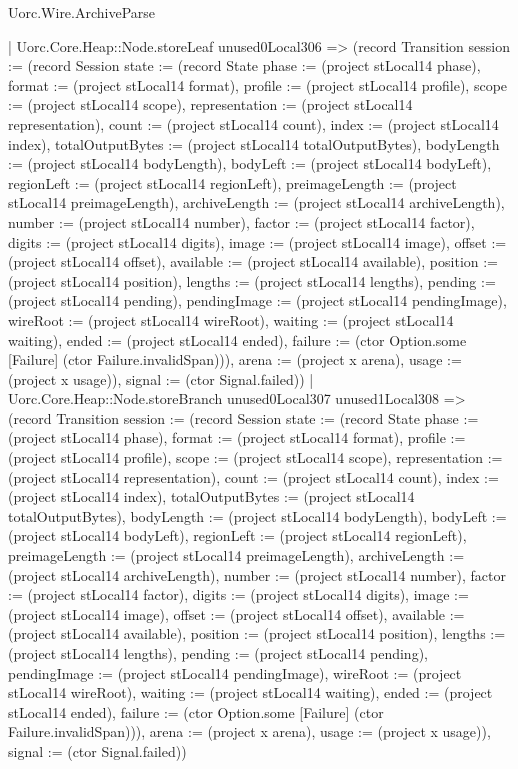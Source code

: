 \begin{lexlean}{Uorc.Wire.ArchiveParse}
\begin{semanticmodule}
{            | Uorc.Core.Heap::Node.storeLeaf unused0Local306 => (record Transition {session := (record Session {state := (record State {phase := (project stLocal14 phase), format := (project stLocal14 format), profile := (project stLocal14 profile), scope := (project stLocal14 scope), representation := (project stLocal14 representation), count := (project stLocal14 count), index := (project stLocal14 index), totalOutputBytes := (project stLocal14 totalOutputBytes), bodyLength := (project stLocal14 bodyLength), bodyLeft := (project stLocal14 bodyLeft), regionLeft := (project stLocal14 regionLeft), preimageLength := (project stLocal14 preimageLength), archiveLength := (project stLocal14 archiveLength), number := (project stLocal14 number), factor := (project stLocal14 factor), digits := (project stLocal14 digits), image := (project stLocal14 image), offset := (project stLocal14 offset), available := (project stLocal14 available), position := (project stLocal14 position), lengths := (project stLocal14 lengths), pending := (project stLocal14 pending), pendingImage := (project stLocal14 pendingImage), wireRoot := (project stLocal14 wireRoot), waiting := (project stLocal14 waiting), ended := (project stLocal14 ended), failure := (ctor Option.some [Failure] (ctor Failure.invalidSpan))}), arena := (project x arena), usage := (project x usage)}), signal := (ctor Signal.failed)})
            | Uorc.Core.Heap::Node.storeBranch unused0Local307 unused1Local308 => (record Transition {session := (record Session {state := (record State {phase := (project stLocal14 phase), format := (project stLocal14 format), profile := (project stLocal14 profile), scope := (project stLocal14 scope), representation := (project stLocal14 representation), count := (project stLocal14 count), index := (project stLocal14 index), totalOutputBytes := (project stLocal14 totalOutputBytes), bodyLength := (project stLocal14 bodyLength), bodyLeft := (project stLocal14 bodyLeft), regionLeft := (project stLocal14 regionLeft), preimageLength := (project stLocal14 preimageLength), archiveLength := (project stLocal14 archiveLength), number := (project stLocal14 number), factor := (project stLocal14 factor), digits := (project stLocal14 digits), image := (project stLocal14 image), offset := (project stLocal14 offset), available := (project stLocal14 available), position := (project stLocal14 position), lengths := (project stLocal14 lengths), pending := (project stLocal14 pending), pendingImage := (project stLocal14 pendingImage), wireRoot := (project stLocal14 wireRoot), waiting := (project stLocal14 waiting), ended := (project stLocal14 ended), failure := (ctor Option.some [Failure] (ctor Failure.invalidSpan))}), arena := (project x arena), usage := (project x usage)}), signal := (ctor Signal.failed)})
}
\end{semanticmodule}
\end{lexlean}
